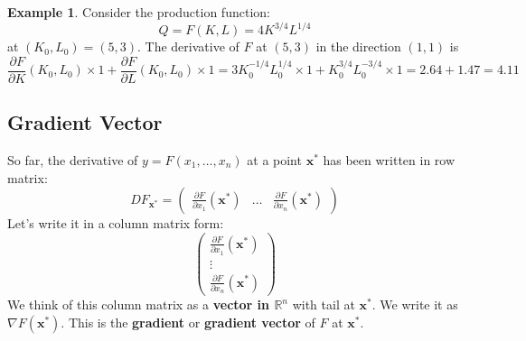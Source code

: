 \documentclass[10pt,a4paper]{book}
\theoremstyle{definition}\newtheorem{definition}{Definition}
\theoremstyle{definition}\newtheorem{fact}{Fact}
\theoremstyle{definition}\newtheorem{ex}{Ex.}
\theoremstyle{definition}\newtheorem{project}{Project}
\theoremstyle{definition}\newtheorem{problem}{Problem}
\theoremstyle{definition}\newtheorem{example}{Example}
\numberwithin{theorem}{chapter}
\numberwithin{corollary}{chapter}
\numberwithin{assumption}{chapter}
\numberwithin{definition}{chapter}
\numberwithin{prop}{chapter}
\numberwithin{notation}{chapter}
\numberwithin{problem}{chapter}
\numberwithin{example}{chapter}
\numberwithin{fact}{chapter}
\numberwithin{ex}{chapter}
\def\R{\mathbb R}
\def\R{\mathbb R}
\def\x{\mathbf x}
\begin{document}
	\begin{example}
		Consider the production function:
		\begin{equation*}
			Q = F(K,L) = 4 K^{3/4} L^{1/4}
		\end{equation*}
		at $(K_0,L_0)= (5,3)$. 
		The derivative of $F$ at $(5,3)$ in the direction $(1,1)$ is
		\begin{equation*}
			\frac{\partial F}{\partial K} (K_0, L_0) \times 1 + \frac{\partial F}{\partial L} (K_0, L_0)\times 1 = 3K_0^{-1/4}L_0^{1/4} \times 1 + K_0^{3/4}L_0^{-3/4}\times 1 = 2.64 + 1.47 = 4.11
		\end{equation*}
	\end{example}
	
	\subsection{Gradient Vector}
	So far, the derivative of $y=F(x_1,\dots,x_n)$ at a point $\x^*$ has been written in row matrix:
	\begin{equation*}
		DF_{\x^*} = \begin{pmatrix}
			\frac{\partial F}{\partial x_1}(\x^*)  & \dots & \frac{\partial F}{\partial x_n}(\x^*)
		\end{pmatrix}
	\end{equation*}
	Let's write it in a column matrix form:
	\begin{equation*}
		\begin{pmatrix}
			\frac{\partial F}{\partial x_1}(\x^*) \\ \vdots \\ \frac{\partial F}{\partial x_n}(\x^*)
		\end{pmatrix}
	\end{equation*}
	We think of this column matrix as a \textbf{vector in $\R^n$} with tail at $\x^*$. We write it as $\nabla F(\x^*)$. This is the \textbf{gradient} or \textbf{gradient vector} of $F$ at $\x^*$. 
	
\end{document}
